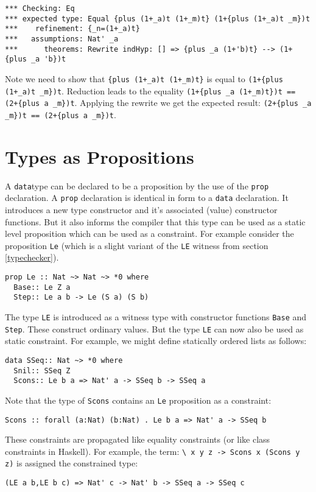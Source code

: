 \documentclass[11pt,twoside]{article}
\begin{document}
\begin{verbatim}
*** Checking: Eq
*** expected type: Equal {plus (1+_a)t (1+_m)t} (1+{plus (1+_a)t _m})t
***    refinement: {_n=(1+_a)t}
***   assumptions: Nat' _a
***      theorems: Rewrite indHyp: [] => {plus _a (1+'b)t} --> (1+{plus _a 'b})t
\end{verbatim}

Note we need to show that \verb|{plus (1+_a)t (1+_m)t}|
is equal to \verb|(1+{plus (1+_a)t _m})t|. Reduction leads to the equality
\verb|(1+{plus _a (1+_m)t})t == (2+{plus a _m})t|. Applying the rewrite
we get the expected result: \verb|(2+{plus _a _m})t == (2+{plus a _m})t|.

\section{Types as Propositions}

A {\tt data}type can be declared to be a proposition by the use
of the {\tt prop} declaration. A {\tt prop} declaration is 
identical in form to a {\tt data} declaration. It introduces
a new type constructor and it's associated (value) constructor functions.
But it also informs the compiler that this type can be used as
a static level proposition which can be used as a constraint.
For example consider the proposition {\tt Le} (which is a slight
variant of the {\tt LE} witness from section \ref{typechecker}).
\begin{verbatim}
prop Le :: Nat ~> Nat ~> *0 where
  Base:: Le Z a
  Step:: Le a b -> Le (S a) (S b)
\end{verbatim}
The type {\tt LE} is introduced as a witness type with constructor
functions {\tt Base} and {\tt Step}. These construct ordinary values.
But the type {\tt LE} can now also be used as static constraint.
For example, we might define statically ordered lists as follows:

\begin{verbatim}
data SSeq:: Nat ~> *0 where
  Snil:: SSeq Z
  Scons:: Le b a => Nat' a -> SSeq b -> SSeq a
\end{verbatim}
Note that the type of {\tt Scons} contains an {\tt Le}
proposition as a constraint:

\begin{verbatim}
Scons :: forall (a:Nat) (b:Nat) . Le b a => Nat' a -> SSeq b
\end{verbatim}

These constraints are propagated like equality constraints
(or like class constraints in Haskell). For example, the
term: \verb+\ x y z -> Scons x (Scons y z)+ is assigned the 
constrained type:
\begin{verbatim}
(LE a b,LE b c) => Nat' c -> Nat' b -> SSeq a -> SSeq c
\end{verbatim}
\end{document}
